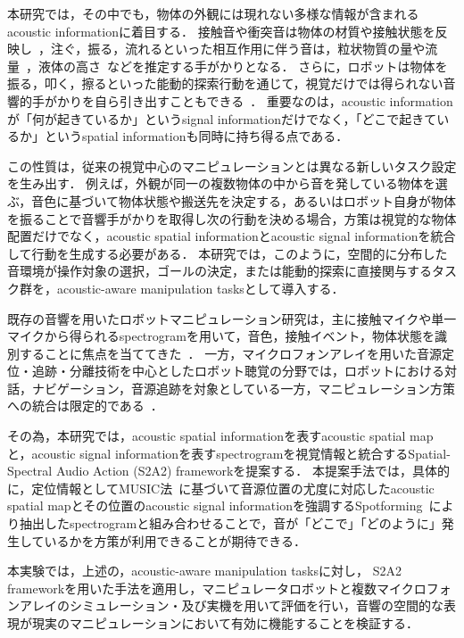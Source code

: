 \documentclass{article}
\begin{document}
本研究では，その中でも，物体の外観には現れない多様な情報が含まれるacoustic informationに着目する．
接触音や衝突音は物体の材質や接触状態を反映し~\citep{seehearfeel,thatsoundsright,hearingtouch2024,maniwav,multigen2025}，注ぐ，振る，流れるといった相互作用に伴う音は，粒状物質の量や流量~\citep{clarke2018learning,wilson2019pouring}，液体の高さ~\citep{liang2020audiopouring,du2021robotpouring}などを推定する手がかりとなる．
さらに，ロボットは物体を振る，叩く，擦るといった能動的探索行動を通じて，視覚だけでは得られない音響的手がかりを自ら引き出すこともできる~\citep{eppe2018interactive,caver2025,mosaic2024}．
重要なのは，acoustic informationが「何が起きているか」というsignal informationだけでなく，「どこで起きているか」というspatial informationも同時に持ち得る点である．

この性質は，従来の視覚中心のマニピュレーションとは異なる新しいタスク設定を生み出す．
例えば，外観が同一の複数物体の中から音を発している物体を選ぶ，音色に基づいて物体状態や搬送先を決定する，あるいはロボット自身が物体を振ることで音響手がかりを取得し次の行動を決める場合，方策は視覚的な物体配置だけでなく，acoustic spatial informationとacoustic signal informationを統合して行動を生成する必要がある．
本研究では，このように，空間的に分布した音環境が操作対象の選択，ゴールの決定，または能動的探索に直接関与するタスク群を，acoustic-aware manipulation tasksとして導入する．

既存の音響を用いたロボットマニピュレーション研究は，主に接触マイクや単一マイクから得られるspectrogramを用いて，音色，接触イベント，物体状態を識別することに焦点を当ててきた~\citep{playitbyear,seehearfeel,maniwav,hearingtouch2024,audiovla}．
一方，マイクロフォンアレイを用いた音源定位・追跡・分離技術を中心としたロボット聴覚の分野では，ロボットにおける対話，ナビゲーション，音源追跡を対象としている一方，マニピュレーション方策への統合は限定的である~\citep{nakadai2020robotaudition,robotaudition_review2025}．

その為，本研究では，acoustic spatial informationを表すacoustic spatial mapと，acoustic signal informationを表すspectrogramを視覚情報と統合するSpatial-Spectral Audio Action (S2A2) frameworkを提案する．
本提案手法では，具体的に，定位情報としてMUSIC法~\citep{schmidt1986music,doa_survey2025}に基づいて音源位置の尤度に対応したacoustic spatial mapとその位置のacoustic signal informationを強調するSpotforming~\citep{spotforming_nmf}により抽出したspectrogramと組み合わせることで，音が「どこで」「どのように」発生しているかを方策が利用できることが期待できる．

本実験では，上述の，acoustic-aware manipulation tasksに対し，
S2A2 frameworkを用いた手法を適用し，マニピュレータロボットと複数マイクロフォンアレイのシミュレーション・及び実機を用いて評価を行い，音響の空間的な表現が現実のマニピュレーションにおいて有効に機能することを検証する．
\end{document}
